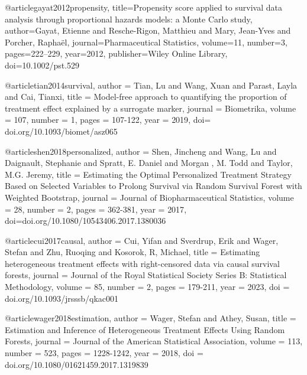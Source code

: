 @article{gayat2012propensity,
  title={Propensity score applied to survival data analysis through proportional hazards models: a Monte Carlo study},
  author={Gayat, Etienne and Resche-Rigon, Matthieu and Mary, Jean-Yves and Porcher, Raphaël},
  journal={Pharmaceutical Statistics},
  volume={11},
  number={3},
  pages={222--229},
  year={2012},
  publisher={Wiley Online Library},
  doi={10.1002/pst.529}
}






@article{tian2014survival,
  author = {Tian, Lu and Wang, Xuan and Parast, Layla and Cai, Tianxi},
  title = {Model-free approach to quantifying the proportion of treatment effect explained by a surrogate marker},
  journal = {Biometrika},
  volume = {107},
  number = {1},
  pages = {107-122},
  year = {2019},
  doi= {doi.org/10.1093/biomet/asz065}
}





@article{shen2018personalized,
  author = {Shen, Jincheng and Wang, Lu and Daignault, Stephanie and Spratt, E. Daniel and Morgan , M. Todd and Taylor, M.G. Jeremy},
  title = {Estimating the Optimal Personalized Treatment Strategy Based on Selected Variables to Prolong Survival via Random Survival Forest with Weighted Bootstrap},
  journal = {Journal of Biopharmaceutical Statistics},
  volume = {28},
  number = {2},
  pages = {362-381},
  year = {2017},
  doi={doi.org/10.1080/10543406.2017.1380036}
}





@article{cui2017causal,
  author = {Cui, Yifan and Sverdrup, Erik and Wager, Stefan and Zhu, Ruoqing and Kosorok, R, Michael},
  title = {Estimating heterogeneous treatment effects with right-censored data via causal survival forests},
  journal = {Journal of the Royal Statistical Society Series B: Statistical Methodology},
  volume = {85},
  number = {2},
  pages = {179-211},
  year = {2023},
  doi = {doi.org/10.1093/jrsssb/qkac001}
}






@article{wager2018estimation,
  author = {Wager, Stefan and Athey, Susan},
  title = {Estimation and Inference of Heterogeneous Treatment Effects Using Random Forests},
  journal = {Journal of the American Statistical Association},
  volume = {113},
  number = {523},
  pages = {1228-1242},
  year = {2018},
  doi = {doi.org/10.1080/01621459.2017.1319839}
}





